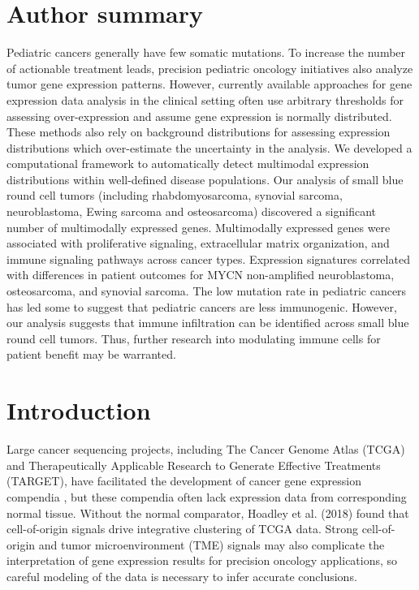 \documentclass[10pt,letterpaper]{article}
\begin{document}
\section*{Author summary}
Pediatric cancers generally have few somatic mutations. To increase the number of actionable treatment leads, precision pediatric oncology initiatives also analyze tumor gene expression patterns. However, currently available approaches for gene expression data analysis in the clinical setting often use arbitrary thresholds for assessing over-expression and assume gene expression is normally distributed. These methods also rely on background distributions for assessing expression distributions which over-estimate the uncertainty in the analysis. We developed a computational framework to automatically detect multimodal expression distributions within well-defined disease populations. Our analysis of small blue round cell tumors (including rhabdomyosarcoma, synovial sarcoma, neuroblastoma, Ewing sarcoma and osteosarcoma) discovered a significant number of multimodally expressed genes. Multimodally expressed genes were associated with proliferative signaling, extracellular matrix organization, and immune signaling pathways across cancer types. Expression signatures correlated with differences in patient outcomes for MYCN non-amplified neuroblastoma, osteosarcoma, and synovial sarcoma. The low mutation rate in pediatric cancers has led some to suggest that pediatric cancers are less immunogenic. However, our analysis suggests that immune infiltration can be identified across small blue round cell tumors. Thus, further research into modulating immune cells for patient benefit may be warranted.

\linenumbers

\section*{Introduction}
Large cancer sequencing projects, including The Cancer Genome Atlas (TCGA) and Therapeutically Applicable Research to Generate Effective Treatments (TARGET), have facilitated the development of cancer gene expression compendia \cite{vivianToilEnablesReproducible2017, pughGeneticLandscapeHighrisk2013, goldmanUCSCXenaPlatform2018, thecancergenomeatlasresearchnetworkCancerGenomeAtlas2013, newtonTumorMapExploringMolecular2017, vaskeComparativeTumorRNA2019}, but these compendia often lack expression data from corresponding normal tissue. Without the normal comparator, Hoadley et al. (2018) found that cell-of-origin signals drive integrative clustering of TCGA data. Strong cell-of-origin and tumor microenvironment (TME) signals may also complicate the interpretation of gene expression results for precision oncology applications, so careful modeling of the data is necessary to infer accurate conclusions. 
\end{document}
